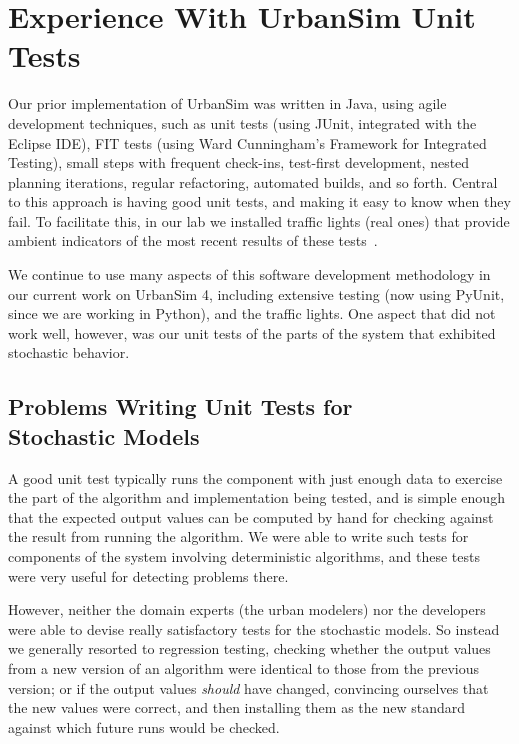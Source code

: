 \documentclass{sig-alternate-preprint}
\begin{document}
\newpage

\section{Experience With UrbanSim Unit Tests}
\label{prior-experience}

Our prior implementation of UrbanSim was written in Java, using agile
development techniques, such as unit tests (using JUnit, integrated with
the Eclipse IDE), FIT tests (using Ward Cunningham's Framework for
Integrated Testing), small steps with frequent check-ins, test-first
development, nested planning iterations, regular refactoring, automated
builds, and so forth.  Central to this approach is having good unit tests,
and making it easy to know when they fail.  To facilitate this, in our lab
we installed traffic lights (real ones) that provide ambient indicators of
the most recent results of these tests~\cite{freeman-benson-agile-2003}.

We continue to use many aspects of this software development methodology in
our current work on UrbanSim 4, including extensive testing (now using PyUnit,
since we are working in Python), and the traffic lights.  One aspect that did
not work well, however, was our unit tests of the parts of the system
that exhibited stochastic behavior.

\subsection{Problems Writing Unit Tests for \\ Stochastic Models}

A good
unit test typically runs the component with just enough data to exercise the
part of the algorithm and implementation being tested, and is simple enough
that the expected output values can be computed by hand for checking against
the result from running the algorithm.  We were able to write such tests for
components of the system involving deterministic algorithms, and these tests
were very useful for detecting problems there.

However, neither the domain experts (the urban modelers) nor the developers
were able to devise really satisfactory tests for the stochastic models.
So instead we generally resorted to regression testing, checking whether
the output values from a new version of an algorithm were identical to
those from the previous version; or if the output values \emph{should} have
changed, convincing ourselves that the new values were correct, and then
installing them as the new standard against which future runs would be
checked.
\end{document}
